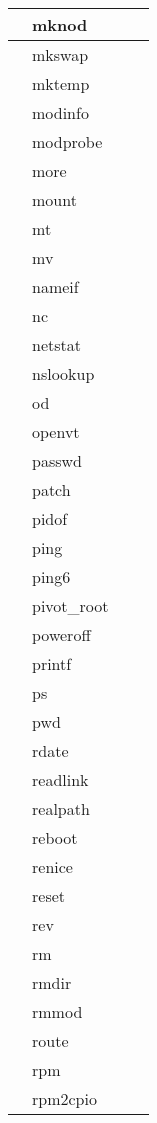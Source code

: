 \begin{longtable}{llp{120mm}p{120mm}}
     \hline
      & mknod \\
     \hline
      & mkswap \\
     \hline
      & mktemp \\
     \hline
      & modinfo \\
     \hline
      & modprobe \\
     \hline
      & more \\
     \hline
      & mount \\
     \hline
      & mt \\
     \hline
      & mv \\
     \hline
      & nameif \\
     \hline
      & nc \\
     \hline
      & netstat \\
     \hline
      & nslookup \\
     \hline
      & od \\
     \hline
      & openvt \\
     \hline
      & passwd \\
     \hline
      & patch \\
     \hline
      & pidof \\
     \hline
      & ping \\
     \hline
      & ping6 \\
     \hline
      & pivot\_root \\
     \hline
      & poweroff \\
     \hline
      & printf \\
     \hline
      & ps \\
     \hline
      & pwd \\
     \hline
      & rdate \\
     \hline
      & readlink \\
     \hline
      & realpath \\
     \hline
      & reboot \\
     \hline
      & renice \\
     \hline
      & reset \\
     \hline
      & rev \\
     \hline
      & rm \\
     \hline
      & rmdir \\
     \hline
      & rmmod \\
     \hline
      & route \\
     \hline
      & rpm \\
     \hline
      & rpm2cpio \\

\end{longtable}
